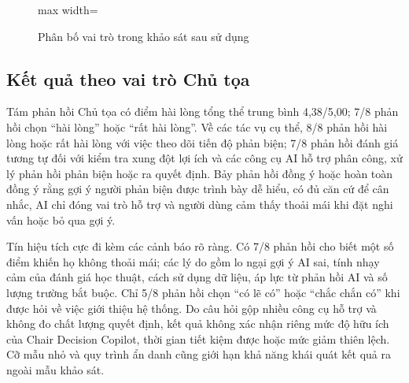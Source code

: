 \begin{figure}[H]
    \centering
    \begin{adjustbox}{max width=\textwidth}
    \end{adjustbox}
    \caption{Phân bố vai trò trong khảo sát sau sử dụng}
    \label{fig:ch4-uat-role-distribution}
\end{figure}

\subsection{Kết quả theo vai trò Chủ tọa}

Tám phản hồi Chủ tọa có điểm hài lòng tổng thể trung bình 4,38/5,00; 7/8 phản hồi chọn ``hài lòng'' hoặc ``rất hài lòng''. Về các tác vụ cụ thể, 8/8 phản hồi hài lòng hoặc rất hài lòng với việc theo dõi tiến độ phản biện; 7/8 phản hồi đánh giá tương tự đối với kiểm tra xung đột lợi ích và các công cụ AI hỗ trợ phân công, xử lý phản hồi phản biện hoặc ra quyết định. Bảy phản hồi đồng ý hoặc hoàn toàn đồng ý rằng gợi ý người phản biện được trình bày dễ hiểu, có đủ căn cứ để cân nhắc, AI chỉ đóng vai trò hỗ trợ và người dùng cảm thấy thoải mái khi đặt nghi vấn hoặc bỏ qua gợi ý.

Tín hiệu tích cực đi kèm các cảnh báo rõ ràng. Có 7/8 phản hồi cho biết một số điểm khiến họ không thoải mái; các lý do gồm lo ngại gợi ý AI sai, tính nhạy cảm của đánh giá học thuật, cách sử dụng dữ liệu, áp lực từ phản hồi AI và số lượng trường bắt buộc. Chỉ 5/8 phản hồi chọn ``có lẽ có'' hoặc ``chắc chắn có'' khi được hỏi về việc giới thiệu hệ thống. Do câu hỏi gộp nhiều công cụ hỗ trợ và không đo chất lượng quyết định, kết quả không xác nhận riêng mức độ hữu ích của Chair Decision Copilot, thời gian tiết kiệm được hoặc mức giảm thiên lệch. Cỡ mẫu nhỏ và quy trình ẩn danh cũng giới hạn khả năng khái quát kết quả ra ngoài mẫu khảo sát.


